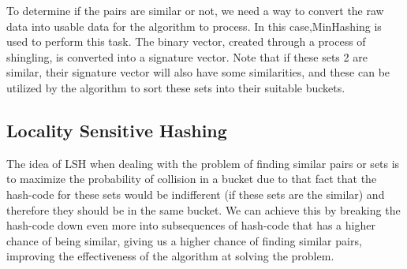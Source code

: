 To determine if the pairs are similar or not, we need a way to convert the raw data into usable data for the algorithm to process.
In this case,MinHashing is used to perform this task.
The binary vector, created through a process of shingling, is converted into a signature vector.
Note that if these sets 2 are similar, their signature vector will also have some similarities, and these can be utilized by the algorithm to sort these sets into their suitable buckets.

\subsection{Locality Sensitive Hashing}
\label{subsec:locality-sensitive-hashing}

The idea of LSH when dealing with the problem of finding similar pairs or sets is to maximize the probability of collision in a bucket due to that fact that the hash-code for these sets would be indifferent (if these sets are the similar) and therefore they should be in the same bucket.
We can achieve this by breaking the hash-code down even more into subsequences of hash-code that has a higher chance of being similar, giving us a higher chance of finding similar pairs, improving the effectiveness of the algorithm at solving the problem.